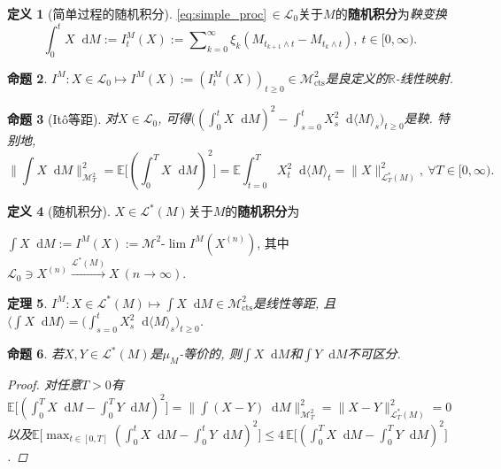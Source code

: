\documentclass{ctexart}
\theoremstyle{definition}
\newtheorem{Def}{定义}[section]
\theoremstyle{remark}
\theoremstyle{plain}
\newtheorem{Prop}[Def]{命题}
\newtheorem{Thm}[Def]{定理}
\newcommand{\1}{\mathbbm{1}}				%
\newcommand{\E}{\mathbb{E}}					%
\newcommand{\agp}[1]{\langle #1 \rangle}	%
\newcommand{\norm}[1]{\lVert#1\rVert}
\newcommand{\R}{\mathbb{R}}					%
\newcommand{\tint}{\textstyle\int\nolimits}
\newcommand{\tsum}{\textstyle\sum\nolimits}
\renewcommand*{\d}{\mathop{}\!\mathrm{d}}	%
\begin{document}
\begin{Def}[简单过程的随机积分]
\eqref{eq:simple_proc}\,$\in\mathcal{L}_{0}$关于$M$的\textbf{随机积分}为\emph{鞅变换}
\[ \tint_{0}^{t} X \d M := I^{M}_{t}(X) := \tsum_{k=0}^{\infty} \xi_{k} (M_{t_{k+1}\wedge t} - M_{t_{k}\wedge t}) , \ t \in [0,\infty) . \]
\end{Def}

\begin{Prop}
$I^{M} : X \in \mathcal{L}_{0} \mapsto I^{M}(X) := (I^{M}_{t}(X))_{t \ge 0} \in \mathcal{M}^{2}_{\mathrm{cts}}$是良定义的$\R$-线性映射.
\end{Prop}
\begin{Prop}[It\^{o}等距]
对$X \in \mathcal{L}_{0}$, 可得$\big( (\tint_{0}^{t} X \d M)^{2} - \tint_{s=0}^{t} X_{s}^{2} \d\agp{M}_{s} \big)_{t \ge 0}$是鞅. 特别地, 
\[ \norm{\tint X \d M}_{\mathcal{M}_{T}^{2}}^{2} = \E\big[ (\tint_{0}^{T} X \d M)^{2} \big] = \E\tint_{t=0}^{T} X_{t}^{2} \d\agp{M}_{t} = \norm{X}_{\mathcal{L}_{T}^{*}(M)}^{2} , \ \forall T \in [0,\infty) . \]
\end{Prop}

\begin{Def}[随机积分]
$X \in \mathcal{L}^{*}(M)$关于$M$的\textbf{随机积分}为\begin{center}
$\int X \d M := I^{M}(X) := \mathcal{M}^{2}\text{-}\lim I^{M}(X^{(n)})$, 其中$\mathcal{L}_{0} \owns X^{(n)} \xrightarrow{\mathcal{L}^{*}(M)} X ~(n\to\infty)$.
\end{center}
\end{Def}

\begin{Thm}
$I^{M} : X \in \mathcal{L}^{*}(M) \mapsto \int X \d M \in \mathcal{M}^{2}_{\mathrm{cts}}$是线性等距, 且$\agp{\int X \d M} = \big(\tint_{s=0}^{t} X_{s}^{2} \d\agp{M}_{s} \big)_{t \ge 0}$.
\end{Thm}

\begin{Prop}
若$X,Y \in \mathcal{L}^{*}(M)$是$\mu_{M}$-等价的, 则$\int X \d M$和$\int Y \d M$不可区分.
\begin{proof}
对任意$T > 0$有$\E\big[( \tint_{0}^{T} X \d M - \tint_{0}^{T} Y \d M )^{2}\big] = \norm{\tint (X-Y) \d M}_{\mathcal{M}_{T}^{2}}^{2} = \norm{X-Y}_{\mathcal{L}_{T}^{*}(M)}^{2} = 0$以及$\E\big[\!\max_{t \in [0,T]} ( \tint_{0}^{t} X \d M - \tint_{0}^{t} Y \d M )^{2}\big] \le 4 \,\E\big[( \tint_{0}^{T} X \d M - \tint_{0}^{T} Y \d M )^{2}\big]$.
\end{proof}
\end{Prop}
\end{document}
